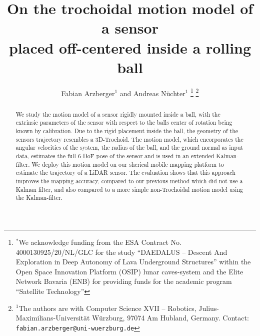 \documentclass[a4paper, 10pt, conference]{ieeeconf}      %
\title{\LARGE \bf
On the trochoidal motion model of a sensor\\placed off-centered inside a rolling ball
}
\author{Fabian Arzberger$^{1}$ and Andreas N{\"u}chter$^{1}$%
\thanks{$^{*}$We acknowledge funding from the ESA Contract No. 4000130925/20/NL/GLC for the study ``DAEDALUS -- Descent And Exploration in Deep Autonomy of Lava Underground Structures'' within the Open Space Innovation Platform (OSIP) lunar caves-system and the Elite Network Bavaria (ENB) for providing funds for the academic program ``Satellite Technology''}%
\thanks{$^{1}$The authors are with Computer Science XVII -- Robotics,
        Julius-Maximilians-Universit{\"a}t W{\"u}rzburg, 97074 Am Hubland, Germany.
        {Contact: \tt\small fabian.arzberger@uni-wuerzburg.de}}%
}
\begin{document}
\maketitle
\thispagestyle{empty}
\pagestyle{empty}


\begin{abstract}
We study the motion model of a sensor rigidly mounted inside a ball, with the extrinsic parameters of the sensor with respect to the balls center of rotation being known by calibration.
Due to the rigid placement inside the ball, the geometry of the sensors trajectory resembles a 3D-Trochoid.
The motion model, which encorporates the angular velocities of the system, the radius of the ball, and the ground normal as input data, estimates the full 6-DoF pose of the sensor and is used in an extended Kalman-filter.
We deploy this motion model on our sherical mobile mapping platform to estimate the trajectory of a LiDAR sensor.
The evaluation shows that this approach improves the mapping accuracy, compared to our previous method which did not use a Kalman filter, and also compared to a more simple non-Trochoidal motion model using the Kalman-filter.     

\end{abstract}












% 
% 
\end{document}

